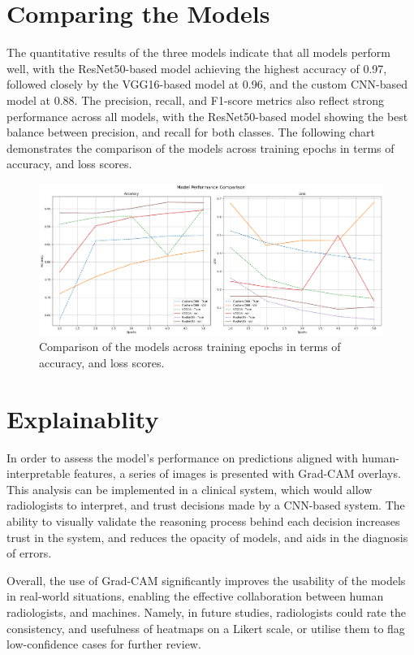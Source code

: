 \documentclass[../main]{subfiles}
\begin{document}
\section{Comparing the Models}
\label{sec:comparing-models}
The quantitative results of the three models indicate that all models perform well, with the ResNet50-based model achieving the highest accuracy of 0.97, followed closely by the VGG16-based model at 0.96, and the custom CNN-based model at 0.88. The precision, recall, and F1-score metrics also reflect strong performance across all models, with the ResNet50-based model showing the best balance between precision, and recall for both classes. The following chart demonstrates the comparison of the models across training epochs in terms of accuracy, and loss scores.

\begin{figure}[h]
    \centering
    \includegraphics[width=1\textwidth]{assets/comparison.png}
    \caption{Comparison of the models across training epochs in terms of accuracy, and loss scores.}
    \label{fig:comparison-models}
\end{figure}

\section{Explainablity}
\label{sec:explainability}
In order to assess the model's performance on predictions aligned with human-interpretable features, a series of images is presented with Grad-CAM overlays. This analysis can be implemented in a clinical system, which would allow radiologists to interpret, and trust decisions made by a CNN-based system. The ability to visually validate the reasoning process behind each decision increases trust in the system, and reduces the opacity of models, and aids in the diagnosis of errors.

Overall, the use of Grad-CAM significantly improves the usability of the models in real-world situations, enabling the effective collaboration between human radiologists, and machines. Namely, in future studies, radiologists could rate the consistency, and usefulness of heatmaps on a Likert scale, or utilise them to flag low-confidence cases for further review.
\end{document}
